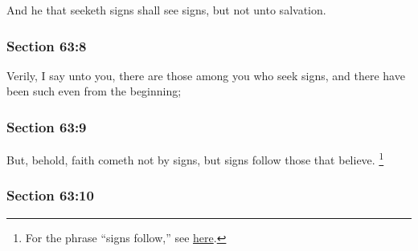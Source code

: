		And he that seeketh signs shall see signs, but not unto salvation.


	\subsubsection{Section 63:8} %
		\label{DC63-8}

		Verily, I say unto you, there are those among you who seek signs, and there have been such even from the beginning;


	\subsubsection{Section 63:9} %
		\label{DC63-9}

		But, behold, faith cometh not by signs, but signs follow those that believe.%
			\footnote{%
				For the phrase ``signs follow,'' see \hyperref[SIGN-PHRASES]{here}.
				}


	\subsubsection{Section 63:10} %
		\label{DC63-10}

